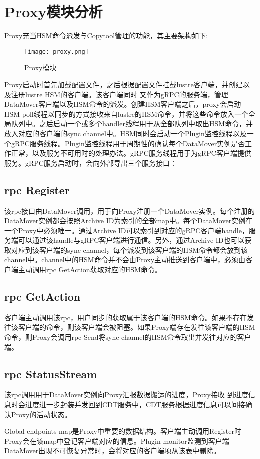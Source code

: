 \section{Proxy模块分析}

Proxy充当HSM命令派发与Copytool管理的功能，其主要架构如下:

\begin{figure}[!htb]
    \centering
    \texttt{[image: proxy.png]}
    \caption{Proxy模块}\label{fig:region-image}
\end{figure}

Proxy启动时首先加载配置文件，之后根据配置文件挂载lustre客户端，并创建以及注册lustre HSM的客户端。该客户端同时 又作为gRPC的服务端，管理DataMover客户端以及HSM命令的派发。创建HSM客户端之后，proxy会启动HSM poll线程以同步的方式接收来自lustre的HSM命令，并将这些命令放入一个全局队列中。之后启动一个或多个handler线程用于从全部队列中取出HSM命令，并放入对应的客户端的sync channel中。HSM同时会启动一个Plugin监控线程以及一个gRPC服务线程。Plugin监控线程用于周期性的确认每个DataMover实例是否工作正常，以及服务不可用时的处理办法。gRPC服务线程用于为gRPC客户端提供服务。gRPC服务启动时，会向外部导出三个服务接口： 

\subsection{rpc Register}
该rpc接口由DataMover调用，用于向Proxy注册一个DataMover实例。每个注册的DataMover实例都会按照Archive ID为索引的全部map中。每个DataMover实例在一个Proxy中必须唯一。通过Archive ID可以索引到对应的gRPC客户端handle，服务端可以通过该handle与gRPC客户端进行通信。另外，通过Archive ID也可以获取对应到该客户端的sync channel，每个派发到该客户端的HSM命令都会放到该channel中。channel中的HSM命令并不会由Proxy主动推送到客户端中，必须由客户端主动调用rpc GetAction获取对应的HSM命令。 

\subsection{rpc GetAction}

客户端主动调用该rpc，用户同步的获取属于该客户端的HSM命令。如果不存在发往该客户端的命令，则该客户端会被阻塞。如果Proxy端存在发往该客户端的HSM命令，则Proxy会调用rpc Send将sync channel的HSM命令取出并发往对应的客户端。 

\subsection{rpc StatusStream}

该rpc调用用于DataMover实例向Proxy汇报数据搬运的进度，Proxy接收 到进度信息时会进度进一步封装并发回到CDT服务中，CDT服务根据进度信息可以间接确认Proxy的活动状态。 

Global endpoints map是Proxy中重要的数据结构。客户端主动调用Register时Proxy会在该map中登记客户端对应的信息。Plugin monitor监测到客户端DataMover出现不可恢复异常时，会将对应的客户端项从该表中删除。 

